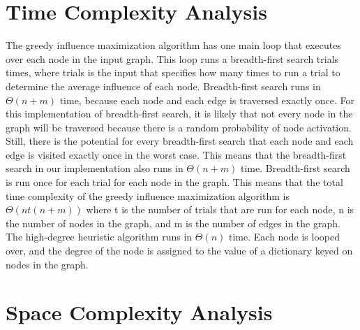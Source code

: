 \documentclass{article}
\begin{document}
\begin{center}
\end{center}


\section{Time Complexity Analysis}

The greedy influence maximization algorithm has one main loop that executes over each node in the input graph.  This loop runs a breadth-first search trials times, where trials is the input that specifies how many times to run a trial to determine the average influence of each node.  Breadth-first search runs in $\Theta(n + m)$ time, because each node and each edge is traversed exactly once.  For this implementation of breadth-first search, it is likely that not every node in the graph will be traversed because there is a random probability of node activation.  Still, there is the potential for every breadth-first search that each node and each edge is visited exactly once in the worst case.  This means that the breadth-first search in our implementation also runs in $\Theta(n + m)$ time.  Breadth-first search is run once for each trial for each node in the graph. This means that the total time complexity of the greedy influence maximization algorithm is $\Theta(nt(n + m))$ where t is the number of trials that are run for each node, n is the number of nodes in the graph, and m is the number of edges in the graph. \\

The high-degree heuristic algorithm runs in $\Theta(n)$ time.  Each node is looped over, and the degree of the node is assigned to the value of a dictionary keyed on nodes in the graph.

\section{Space Complexity Analysis}
\end{document}
